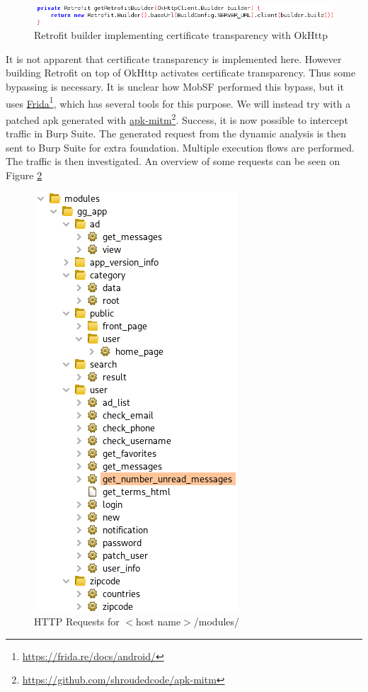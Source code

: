 \begin{figure}[htbp]
    \centering
    \includegraphics[width=1\columnwidth]{../static-analysis/pictures/retrofit-okkhtp-builder.png}
    \caption{Retrofit builder implementing certificate transparency with OkHttp}
    \label{fig:retrofit-ct}
\end{figure}

It is not apparent that certificate transparency is implemented here. However building Retrofit on top of OkHttp activates certificate transparency\cite{android-certificate-transparency}. Thus some bypassing is necessary. It is unclear how MobSF performed this bypass, but it uses \href{https://frida.re/docs/android/}{Frida}\footnote{\href{https://frida.re/docs/android/}{https://frida.re/docs/android/}}, which has several tools for this purpose. We will instead try with a patched apk generated with \href{https://github.com/shroudedcode/apk-mitm}{apk-mitm}\footnote{\href{https://github.com/shroudedcode/apk-mitm}{https://github.com/shroudedcode/apk-mitm}}. Success, it is now possible to intercept traffic in Burp Suite. The generated request from the dynamic analysis is then sent to Burp Suite for extra foundation. Multiple execution flows are performed. The traffic is then investigated. An overview of some requests can be seen on Figure \ref{fig:http-requests-modules}    

\begin{figure}[h!]
    \centering
    \includegraphics[width=0.5\columnwidth]{../dynamic-analysis/pictures/http-requests-modules.png}
    \caption{HTTP Requests for $<$host name$>$/modules/}
    \label{fig:http-requests-modules}
\end{figure}

